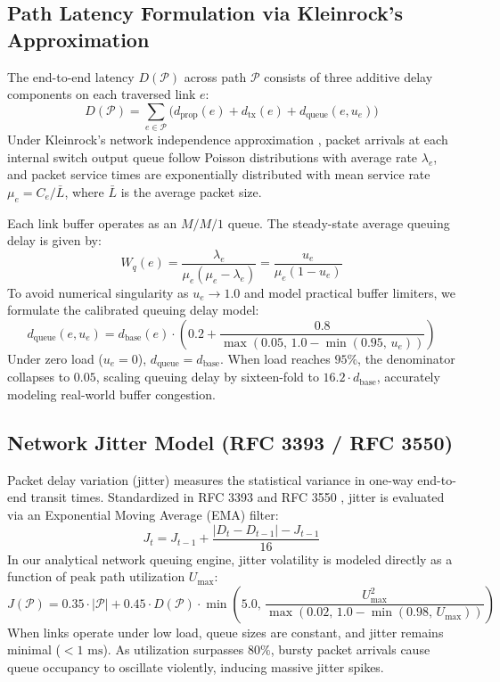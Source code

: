 \documentclass[12pt,a4paper,oneside]{report}
\begin{document}
\subsection{Path Latency Formulation via Kleinrock's Approximation}
The end-to-end latency $D(\mathcal{P})$ across path $\mathcal{P}$ consists of three additive delay components on each traversed link $e$:
\begin{equation}
    D(\mathcal{P}) = \sum_{e \in \mathcal{P}} \Big( d_{\text{prop}}(e) + d_{\text{tx}}(e) + d_{\text{queue}}(e, u_e) \Big)
\end{equation}
Under Kleinrock's network independence approximation \cite{kleinrock1964communication}, packet arrivals at each internal switch output queue follow Poisson distributions with average rate $\lambda_e$, and packet service times are exponentially distributed with mean service rate $\mu_e = C_e / \bar{L}$, where $\bar{L}$ is the average packet size.

Each link buffer operates as an $M/M/1$ queue. The steady-state average queuing delay is given by:
\begin{equation}
    W_q(e) = \frac{\lambda_e}{\mu_e(\mu_e - \lambda_e)} = \frac{u_e}{\mu_e(1 - u_e)}
\end{equation}
To avoid numerical singularity as $u_e \to 1.0$ and model practical buffer limiters, we formulate the calibrated queuing delay model:
\begin{equation}
    d_{\text{queue}}(e, u_e) = d_{\text{base}}(e) \cdot \left( 0.2 + \frac{0.8}{\max\left(0.05, \, 1.0 - \min(0.95, \, u_e)\right)} \right)
    \label{eq:queuing_delay_formula}
\end{equation}
Under zero load ($u_e = 0$), $d_{\text{queue}} = d_{\text{base}}$. When load reaches $95\%$, the denominator collapses to $0.05$, scaling queuing delay by sixteen-fold to $16.2 \cdot d_{\text{base}}$, accurately modeling real-world buffer congestion.

\subsection{Network Jitter Model (RFC 3393 / RFC 3550)}
Packet delay variation (jitter) measures the statistical variance in one-way end-to-end transit times. Standardized in RFC 3393 \cite{deroo2002ip} and RFC 3550 \cite{schulzrinne2003rtp}, jitter is evaluated via an Exponential Moving Average (EMA) filter:
\begin{equation}
    J_t = J_{t-1} + \frac{|D_t - D_{t-1}| - J_{t-1}}{16}
\end{equation}
In our analytical network queuing engine, jitter volatility is modeled directly as a function of peak path utilization $U_{\max}$:
\begin{equation}
    J(\mathcal{P}) = 0.35 \cdot |\mathcal{P}| + 0.45 \cdot D(\mathcal{P}) \cdot \min\left(5.0, \, \frac{U_{\max}^2}{\max(0.02, \, 1.0 - \min(0.98, \, U_{\max}))}\right)
    \label{eq:jitter_analytical_model}
\end{equation}
When links operate under low load, queue sizes are constant, and jitter remains minimal ($< 1\text{ ms}$). As utilization surpasses $80\%$, bursty packet arrivals cause queue occupancy to oscillate violently, inducing massive jitter spikes.
\end{document}
